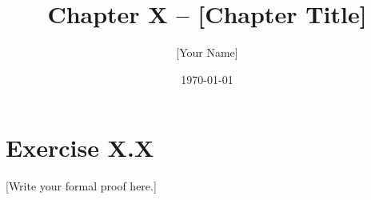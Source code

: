 \documentclass[11pt]{article}
\title{Chapter X – [Chapter Title]}
\author{[Your Name]}
\date{\today}
\begin{document}
\maketitle

\section*{Exercise X.X}
[Write your formal proof here.]
\end{document}
